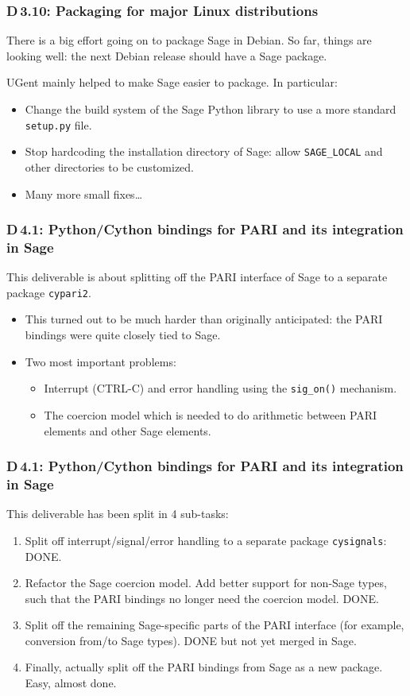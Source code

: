 \documentclass{beamer}
\begin{document}
\begin{frame}
\frametitle{D\,3.10: Packaging for major Linux distributions}
There is a big effort going on to package Sage in Debian.
So far, things are looking well: the next Debian release should have a Sage package.

UGent mainly helped to make Sage easier to package.
In particular:

\begin{itemize}
\item Change the build system of the Sage Python library to use a more standard
\texttt{setup.py} file.
\item Stop hardcoding the installation directory of Sage:
allow \texttt{SAGE\_LOCAL} and other directories to be customized.
\item Many more small fixes\ldots
\end{itemize}
\end{frame}

\begin{frame}
\frametitle{D\,4.1: Python/Cython bindings for PARI and its integration in Sage}

This deliverable is about splitting off the PARI interface of Sage
to a separate package \texttt{cypari2}.

\begin{itemize}
\item This turned out to be much harder than originally anticipated:
the PARI bindings were quite closely tied to Sage.

\item Two most important problems:
\begin{itemize}
\item Interrupt (CTRL-C) and error handling using the \texttt{sig\_on()} mechanism.

\item The coercion model which is needed to do arithmetic between PARI elements
and other Sage elements.
\end{itemize}
\end{itemize}
\end{frame}

\begin{frame}
\frametitle{D\,4.1: Python/Cython bindings for PARI and its integration in Sage}
This deliverable has been split in 4 sub-tasks:
\begin{enumerate}
\item Split off interrupt/signal/error handling to a separate package \texttt{cysignals}:
DONE.

\item Refactor the Sage coercion model. Add better support for non-Sage types,
such that the PARI bindings no longer need the coercion model.
DONE.

\item Split off the remaining Sage-specific parts of the PARI interface
(for example, conversion from/to Sage types).
DONE but not yet merged in Sage.

\item Finally, actually split off the PARI bindings from Sage as a new package.
Easy, almost done.
\end{enumerate}
\end{frame}
\end{document}

